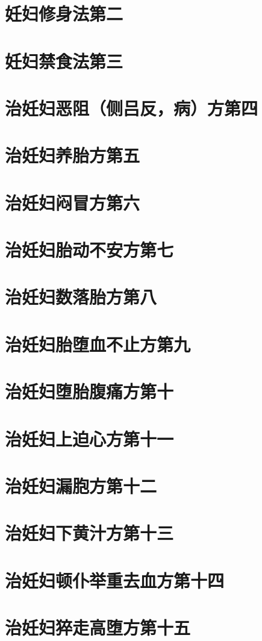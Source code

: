 \documentclass[a4paper,12pt,UTF8,twoside]{ctexbook}
\begin{document}
\chapter{妊妇修身法第二}
\chapter{妊妇禁食法第三}
\chapter{治妊妇恶阻（侧吕反，病）方第四}
\chapter{治妊妇养胎方第五}
\chapter{治妊妇闷冒方第六}
\chapter{治妊妇胎动不安方第七}
\chapter{治妊妇数落胎方第八}
\chapter{治妊妇胎堕血不止方第九}
\chapter{治妊妇堕胎腹痛方第十}
\chapter{治妊妇上迫心方第十一}
\chapter{治妊妇漏胞方第十二}
\chapter{治妊妇下黄汁方第十三}
\chapter{治妊妇顿仆举重去血方第十四}
\chapter{治妊妇猝走高堕方第十五}
\end{document}
